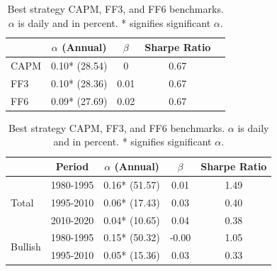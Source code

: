 \documentclass{article}
\begin{document}
\begin{table}[h]
    \centering
    \begin{minipage}{0.4\textwidth}
        \centering
        \begin{tabular}{lcccc}
            \toprule
            & $\alpha$ (Annual) & $\beta$ & Sharpe Ratio \\
            \midrule
            CAPM & 0.10* (28.54) & 0 & 0.67 \\
            FF3  & 0.10* (28.36) & 0.01 & 0.67 \\
            FF6  & 0.09* (27.69) & 0.02 & 0.67 \\
            \bottomrule
        \end{tabular}
        \caption{Best strategy CAPM, FF3, and FF6 benchmarks. $\alpha$ is daily and in percent. * signifies significant $\alpha$.}
        \label{tab:benchmarks}
    \end{minipage}
    \hspace{0.05\textwidth} %
    \begin{minipage}{0.4\textwidth}
        \centering
        \begin{tabular}{lcccc}
            \toprule
             & Period & $\alpha$ (Annual) & $\beta$ & Sharpe Ratio \\
            \midrule
            \multirow{3}{*}{Total} & 1980-1995 & 0.16* (51.57) & 0.01 & 1.49 \\
                                   & 1995-2010 & 0.06* (17.43) & 0.03 & 0.40 \\
                                   & 2010-2020 & 0.04* (10.65) & 0.04 & 0.38 \\
            \midrule
            \multirow{3}{*}{Bullish} & 1980-1995 & 0.15* (50.32) & -0.00 & 1.05 \\
                                     & 1995-2010 & 0.05* (15.36) & 0.03 & 0.33 \\

\end{tabular}
\end{minipage}
\end{table}
\end{document}
